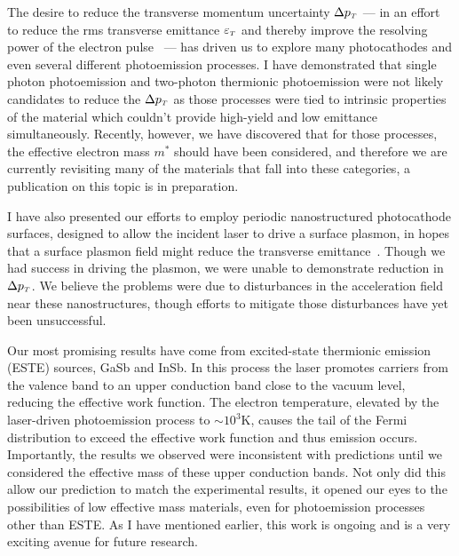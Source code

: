 The desire to reduce the transverse momentum uncertainty $\Delta p_{{\scriptscriptstyle T}}$ --- in an effort to reduce the rms transverse emittance $\varepsilon_{{\scriptscriptstyle T}}$ and thereby improve the resolving power of the electron pulse~\cite{berger_dc_2009} --- has driven us to explore many photocathodes and even several different photoemission processes.
I have demonstrated that single photon photoemission and two-photon thermionic photoemission were not likely candidates to reduce the $\Delta p_{{\scriptscriptstyle T}}$ as those processes were tied to intrinsic properties of the material which couldn't provide high-yield and low emittance simultaneously.
Recently, however, we have discovered that for those processes, the effective electron mass $m^*$ should have been considered, and therefore we are currently revisiting many of the materials that fall into these categories, a publication on this topic is in preparation.

I have also presented our efforts to employ periodic nanostructured photocathode surfaces, designed to allow the incident laser to drive a surface plasmon, in hopes that a surface plasmon field might reduce the transverse emittance~\cite{zawadzka_evanescent_2001,kupersztych_ponderomotive_2001,kupersztych_anomalous_2005,li_surface_2013}.
Though we had success in driving the plasmon, we were unable to demonstrate reduction in $\Delta p_{{\scriptscriptstyle T}}$.
We believe the problems were due to disturbances in the acceleration field near these nanostructures, though efforts to mitigate those disturbances have yet been unsuccessful.

Our most promising results have come from excited-state thermionic emission (ESTE) sources, GaSb and InSb.
In this process the laser promotes carriers from the valence band to an upper conduction band close to the vacuum level, reducing the effective work function.
The electron temperature, elevated by the laser-driven photoemission process to $\sim10^3$K, causes the tail of the Fermi distribution to exceed the effective work function and thus emission occurs.
Importantly, the results we observed were inconsistent with predictions until we considered the effective mass of these upper conduction bands.
Not only did this allow our prediction to match the experimental results, it opened our eyes to the possibilities of low effective mass materials, even for photoemission processes other than ESTE.
As I have mentioned earlier, this work is ongoing and is a very exciting avenue for future research.


